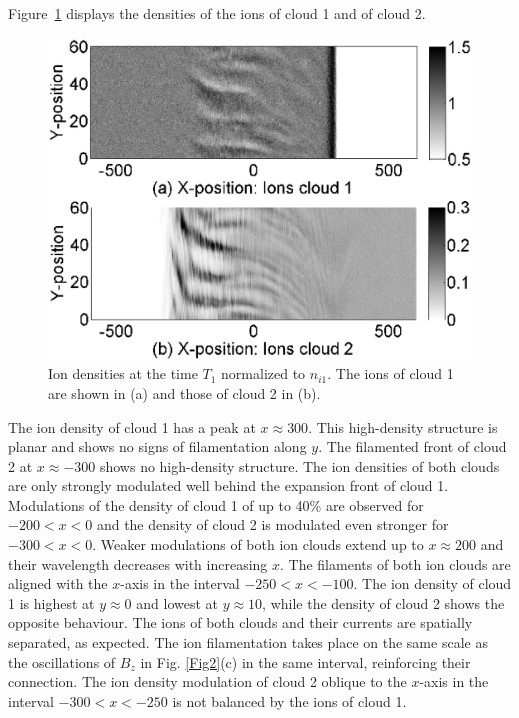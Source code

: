 \documentclass[structabstract]{aa}
\begin{document}
Figure~\ref{Fig4} displays the densities of the ions of cloud 1 and of 
cloud 2.
\begin{figure}
\centering
\includegraphics[width=\columnwidth]{Fig4.eps}
\caption{Ion densities at the time $T_1$ normalized to $n_{i1}$. The ions of 
cloud 1 are shown in (a) and those of cloud 2 in (b).} 
\label{Fig4}
\end{figure}
The ion density of cloud 1 has a peak at $x \approx 300$. This high-density 
structure is planar and shows no signs of filamentation along $y$. The 
filamented front of cloud 2 at $x \approx -300$ shows no high-density 
structure. The ion densities of both clouds are only strongly modulated 
well behind the expansion front of cloud 1. Modulations of the density 
of cloud 1 of up to 40\% are observed for $-200 < x < 0$ and the density 
of cloud 2 is modulated even stronger for $-300<x<0$. Weaker modulations of 
both ion clouds extend up to $x\approx 200$ and their wavelength decreases 
with increasing $x$. The filaments of both ion clouds are aligned 
with the $x$-axis in the interval $-250 < x < -100$. The ion density of 
cloud 1 is highest at $y\approx 0$ and lowest at $y\approx 10$, while the 
density of cloud 2 shows the opposite behaviour. The ions of both clouds 
and their currents are spatially separated, as expected. The ion 
filamentation takes place on the same scale as the oscillations of $B_z$ in 
Fig. \ref{Fig2}(c) in the same interval, reinforcing their connection. The 
ion density modulation of cloud 2 oblique to the $x$-axis in the interval 
$-300 < x < -250$ is not balanced by the ions of cloud 1.
\end{document}
